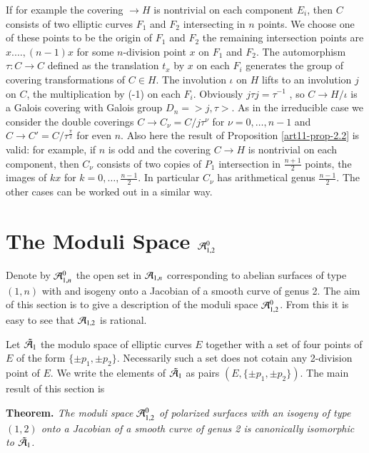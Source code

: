 If for example the covering $\rightarrow H$ is nontrivial on each component $E_{i}$, then $C$ consists of two elliptic curves $F_{1}$ and $F_{2}$  intersecting in $n$ points. We choose one of these points to be the origin of $F_{1}$ and $F_{2}$ the remaining intersection points are $x. \ldots, (n-1)x$ for some $n$-division point $x$ on $F_{1}$ and $F_{2}$. The automorphism $\tau : C\rightarrow C$ defined as the translation $t_{x}$ by $x$ on each $F_{i}$ generates the group of covering transformations of $C\in H$. The involution $\iota$ on $H$ lifts to an involution $j$ on $C$, the multiplication by (-1) on each $F_{i}$. Obviously $j\tau j= \tau^{-1}$ , so $C \rightarrow H/\iota$ is a Galois covering with Galois group
$D_{n} = >j,\tau >$. As in the irreducible case we consider the double coverings $C\rightarrow C_{\nu}=C/j\tau^{\nu}$ for $\nu = 0,\ldots, n-1$ and $C \rightarrow C' =C/\tau^{\frac{\pi}{2}}$ for even $n$. Also here the result of Proposition \ref{art11-prop-2.2} is valid: for example, if $n$ is odd and the covering $C \rightarrow H$ is nontrivial on each component, then $C_{\nu}$ consists of two copies of $P_{1}$  intersection in $\frac{n+1}{2}$ points, the images of $kx$ for $k = 0 ,\ldots, \frac{n-1}{2}$. In particular $C_{\nu}$ has arithmetical genus $\frac{n-1}{2}$. The other cases can be worked out in a similar way.

\section{The Moduli Space $\mathcal{A}^{0}_{1,2}$}\label{art11-sec-3}

Denote by $\mathcal{A}^{0}_{1,n}$ the open set in $\mathcal{A}_{1,n}$ corresponding to abelian surfaces of type $(1,n)$ with and isogeny onto a Jacobian of a smooth curve of genus 2. The aim of this section is to give a description of the moduli space $\mathcal{A}^{0}_{1,2}$. From this it is easy to see that $\mathcal{A}_{1,2}$ is rational.

Let $\tilde{\mathcal{A}}_{1}$ the modulo space of elliptic curves $E$ together with a set of four points of $E$ of the form $\{\pm p_{1}, \pm p_{2}\}$. Necessarily such a set does not cotain any 2-division point of $E$. We write the elements of $\tilde{\mathcal{A}}_{1}$ as pairs $(E, \{\pm p_{1}, \pm p_{2}\})$. The main result of this section is

\medskip
\noindent
{\bfseries {} Theorem. \label{art11-thm-3.1}} \textit{ The moduli space $\mathcal{A}^{0}_{1,2}$ of polarized surfaces with an isogeny of type $(1, 2)$ onto a Jacobian of a smooth curve of genus 2 is canonically isomorphic to $\tilde{\mathcal{A}}_{1}$.}


